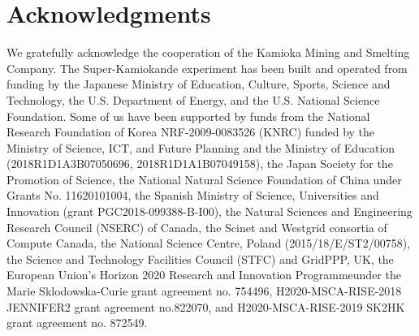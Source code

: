 \section*{Acknowledgments}
We gratefully acknowledge the cooperation of the Kamioka Mining and Smelting Company. The Super-Kamiokande experiment has been built and operated from funding by the Japanese Ministry of Education, Culture, Sports, Science and Technology, the U.S. Department of Energy, and the U.S. National Science Foundation. Some of us have been supported by funds from the National Research Foundation of Korea NRF-2009-0083526 (KNRC) funded by the Ministry of Science, ICT, and Future Planning and the Ministry of Education (2018R1D1A3B07050696, 2018R1D1A1B07049158), the Japan Society for the Promotion of Science, the National Natural Science Foundation of China under Grants No. 11620101004, the Spanish Ministry of Science, Universities and Innovation (grant PGC2018-099388-B-I00), the Natural Sciences and Engineering Research Council (NSERC) of Canada, the Scinet and Westgrid consortia of Compute Canada, the National Science Centre, Poland (2015/18/E/ST2/00758), the Science and Technology Facilities Council (STFC) and GridPPP, UK, the European Union’s Horizon 2020 Research and Innovation Programmeunder the Marie Sklodowska-Curie grant  agreement  no. 754496, H2020-MSCA-RISE-2018 JENNIFER2 grant agreement no.822070, and  H2020-MSCA-RISE-2019 SK2HK grant agreement no. 872549.